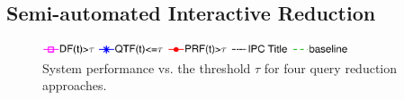 \subsection{Semi-automated Interactive Reduction}

\label{sec:SemiAutomatedInteractiveReduction}

%
%
\begin{figure}[t!]
\begin{centering}
\includegraphics[width=9cm]{imgs/l2.eps}
\vspace*{-4ex}
\par\end{centering}
\begin{centering}
\par\end{centering}
\vspace*{-3ex}
\protect\caption{System performance vs. the threshold $\tau$ for four query reduction approaches.}
\label{fig:queryreduc}
\end{figure}

